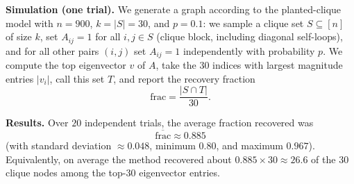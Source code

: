 \documentclass[10pt]{article}
\begin{document}
\medskip
\textbf{Simulation (one trial).}
We generate a graph according to the planted-clique model with $n=900$, $k=|S|=30$, and $p=0.1$:
we sample a clique set $S\subseteq [n]$ of size $k$, set $A_{ij}=1$ for all $i,j\in S$
(clique block, including diagonal self-loops), and for all other pairs $(i,j)$ set $A_{ij}=1$
independently with probability $p$.
We compute the top eigenvector $v$ of $A$, take the $30$ indices with largest magnitude entries $|v_i|$,
call this set $T$, and report the recovery fraction
\[
\mathrm{frac}=\frac{|S\cap T|}{30}.
\]

\medskip
\textbf{Results.}
Over $20$ independent trials, the average fraction recovered was
\[
\boxed{\overline{\mathrm{frac}}\approx 0.885}
\]
(with standard deviation $\approx 0.048$, minimum $0.80$, and maximum $0.967$).
Equivalently, on average the method recovered about $0.885\times 30 \approx 26.6$ of the $30$ clique
nodes among the top-$30$ eigenvector entries.
\end{document}

